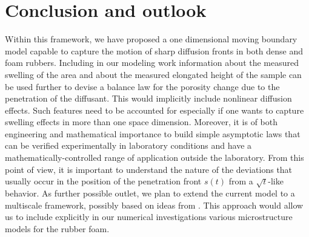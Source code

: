 \documentclass{article}
\begin{document}

\section{Conclusion and outlook}\label{outlook}

Within this framework, we have proposed a one dimensional moving boundary model capable to capture the motion of sharp diffusion fronts in both dense and foam rubbers.  Including in our modeling work information about the measured swelling of the area and about the measured elongated height of the sample can be used further  to devise a balance law for the porosity change due to the penetration of the diffusant. This would implicitly include nonlinear diffusion effects. Such features need to be accounted for especially if one wants to capture swelling effects in more than one space dimension. Moreover, it is of both engineering and mathematical importance to build  simple asymptotic laws that can be verified experimentally in laboratory conditions and have a mathematically-controlled range of application outside the laboratory. From this point of view, it is important to understand the nature of the  deviations that usually occur in the position of the penetration front $s(t)$ from a $\sqrt{t}$-like behavior. As further possible outlet, we plan to  extend the current model to a multiscale framework, possibly based on ideas from \cite{aiki2020macromicro}. This approach would allow us  to include explicitly in our numerical investigations various microstructure models for the rubber foam.
\end{document}
